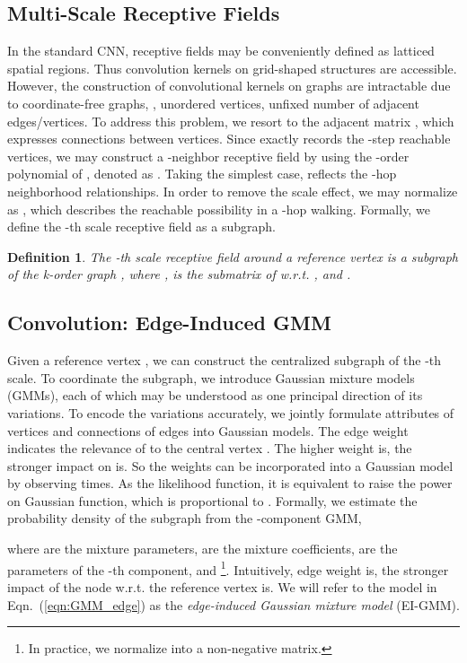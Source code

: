 \documentclass[letterpaper]{article} \usepackage{aaai19}  \usepackage{times}  \usepackage{helvet}  \usepackage{courier}  \usepackage{url}  \usepackage{graphicx}  \frenchspacing  \setlength{\pdfpagewidth}{8.5in}  \setlength{\pdfpageheight}{11in}
\newtheorem{defn}{Definition}
\begin{document}
\subsection{Multi-Scale Receptive Fields} 

In the standard CNN, receptive fields may be conveniently defined as latticed spatial regions. Thus convolution kernels on grid-shaped structures are accessible. However, the construction of convolutional kernels on graphs are intractable due to coordinate-free graphs, \eg, unordered vertices, unfixed number of adjacent edges/vertices. To address this problem, we resort to the adjacent matrix , which expresses connections between vertices. Since  exactly records the -step reachable vertices, we may construct a -neighbor receptive field by using the -order polynomial of , denoted as . Taking the simplest case,  reflects the -hop neighborhood relationships. In order to remove the scale effect, we may normalize  as , which describes the reachable possibility in a -hop walking. Formally, we define the -th scale receptive field as a subgraph.
\begin{defn}\label{def:receptive}
	The -th scale receptive field around a reference vertex  is a subgraph  of the k-order graph , where ,  is the submatrix of  w.r.t. , and .
\end{defn}

\subsection{Convolution: Edge-Induced GMM}

Given a reference vertex , we can construct the centralized subgraph  of the -th scale.
To coordinate the subgraph, we introduce Gaussian mixture models (GMMs), each of which may be understood as one principal direction of its variations. To encode the variations accurately, we jointly formulate attributes of vertices and connections of edges into Gaussian models. The edge weight  indicates the relevance of  to the central vertex . The higher weight is, the stronger impact on  is. So the weights can be incorporated into a Gaussian model by observing  times. As the likelihood function, it is equivalent to raise the power  on Gaussian function, which is proportional to . Formally,  we estimate the probability density of the subgraph  from the -component GMM,

where  are the mixture parameters,  are the mixture coefficients,  are the parameters of the -th component, and  \footnote{In practice, we normalize  into a non-negative matrix.}. Intuitively, edge weight  is, the stronger impact of the node  w.r.t. the reference vertex  is. We will refer to the model in Eqn.~(\ref{eqn:GMM_edge}) as the \textit{edge-induced Gaussian mixture model} (EI-GMM).
\end{document}
